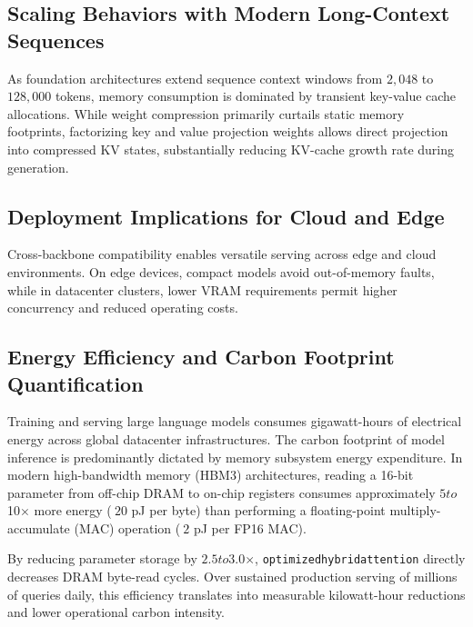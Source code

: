 \subsection{Scaling Behaviors with Modern Long-Context Sequences}
As foundation architectures extend sequence context windows from $2{,}048$ to $128{,}000$ tokens, memory consumption is dominated by transient key-value cache allocations. While weight compression primarily curtails static memory footprints, factorizing key and value projection weights allows direct projection into compressed KV states, substantially reducing KV-cache growth rate during generation.

\subsection{Deployment Implications for Cloud and Edge}
Cross-backbone compatibility enables versatile serving across edge and cloud environments. On edge devices, compact models avoid out-of-memory faults, while in datacenter clusters, lower VRAM requirements permit higher concurrency and reduced operating costs.

\subsection{Energy Efficiency and Carbon Footprint Quantification}
Training and serving large language models consumes gigawatt-hours of electrical energy across global datacenter infrastructures. The carbon footprint of model inference is predominantly dictated by memory subsystem energy expenditure. In modern high-bandwidth memory (HBM3) architectures, reading a 16-bit parameter from off-chip DRAM to on-chip registers consumes approximately $5$\times$ to $10$\times$ more energy ($~20$ pJ per byte) than performing a floating-point multiply-accumulate (MAC) operation ($~2$ pJ per FP16 MAC).

By reducing parameter storage by $2.5$\times$ to $3.0$\times$, \texttt{optimizedhybridattention} directly decreases DRAM byte-read cycles. Over sustained production serving of millions of queries daily, this efficiency translates into measurable kilowatt-hour reductions and lower operational carbon intensity.
